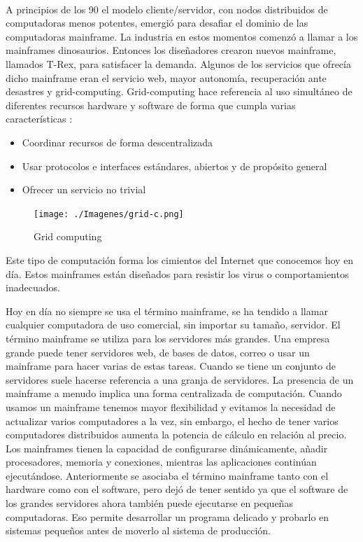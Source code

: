 \documentclass[paper=a4, fontsize=10pt]{scrartcl} %
\numberwithin{equation}{section} %
\numberwithin{figure}{section} %
\numberwithin{table}{section} %
\begin{document}
\


A principios de los 90 el modelo cliente/servidor, con nodos distribuidos de computadoras menos potentes, emergió para desafiar el dominio de las computadoras mainframe.
La industria en estos momentos comenzó a llamar a los mainframes dinosaurios.
Entonces los diseñadores crearon nuevos mainframe, llamados T-Rex, para satisfacer la demanda.
Algunos de los servicios que ofrecía dicho mainframe eran el servicio web, mayor autonomía, recuperación ante desastres y grid-computing.
Grid-computing hace referencia al uso simultáneo de diferentes recursos hardware y software de forma que cumpla varias características \cite{grid-def}:
\begin{itemize}
	\item Coordinar recursos de forma descentralizada
	\item Usar protocolos e interfaces estándares, abiertos y de propósito general
	\item Ofrecer un servicio no trivial
\end{itemize}

\begin{figure}[H]
	\centering
	\label{grid-c}
	\texttt{[image: ./Imagenes/grid-c.png]}
	\caption{Grid computing \cite{grid-c-image}}
\end{figure}

Este tipo de computación forma los cimientos del Internet que conocemos hoy en día.
Estos mainframes están diseñados para resistir los virus o comportamientos inadecuados.


Hoy en día no siempre se usa el término mainframe, se ha tendido a llamar cualquier computadora de uso comercial, sin importar su tamaño, servidor. 
El término mainframe se utiliza para los servidores más grandes.
Una empresa grande puede tener servidores web, de bases de datos, correo o usar un mainframe para hacer varias de estas tareas.
Cuando se tiene un conjunto de servidores suele hacerse referencia a una granja de servidores.
La presencia de un mainframe a menudo implica una forma centralizada de computación.
Cuando usamos un mainframe tenemos mayor flexibilidad y evitamos la necesidad de actualizar varios computadores a la vez, sin embargo, el hecho de tener varios computadores distribuidos aumenta la potencia de cálculo en relación al precio.
Los mainframes tienen la capacidad de configurarse dinámicamente, añadir procesadores, memoria y conexiones, mientras las aplicaciones continúan ejecutándose.
Anteriormente se asociaba el término mainframe tanto con el hardware como con el software, pero dejó de tener sentido ya que el software de los grandes servidores ahora también puede ejecutarse en pequeñas computadoras.
Eso permite desarrollar un programa delicado y probarlo en sistemas pequeños antes de moverlo al sistema de producción.
\end{document}
